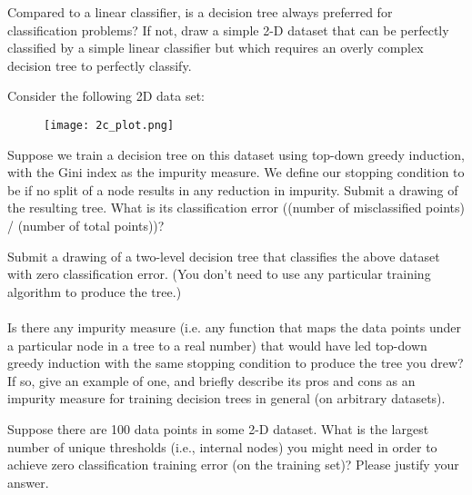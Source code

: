 \newpage
\problem[4] Compared to a linear classifier, is a decision tree always preferred for classification
problems? If not, draw a simple 2-D dataset that can be perfectly classified by a simple linear classifier but which requires an overly complex decision tree to perfectly classify.
\begin{solution}
\end{solution}
\newpage


\problem[15] Consider the following 2D data set:
\noindent
\begin{figure}[H]
\centering
\texttt{[image: 2c\_plot.png]}
\end{figure}
\noindent
\subproblem[5] Suppose we train a decision tree on this dataset using top-down greedy induction, with the Gini index as the impurity measure. We define our stopping condition to be if no split of a node results in any reduction in impurity. Submit a drawing of the resulting tree. What is its classification error ((number of misclassified points) / (number of total points))?
\begin{subsolution}
\end{subsolution}
\newpage


\subproblem[5] Submit a drawing of a two-level decision tree that classifies the above dataset with zero classification error. (You don’t need to use any particular training algorithm to produce the tree.)\\
\\
Is there any impurity measure (i.e. any function that maps the data points under a particular node in a tree to a real number) that would have led top-down greedy induction with the same stopping condition to produce the tree you drew? If so, give an example of one, and briefly describe its pros and cons as an impurity measure for training decision trees in general (on arbitrary datasets).
\begin{subsolution}
\end{subsolution}
\newpage


\subproblem[5] Suppose there are 100 data points in some 2-D dataset. What is the largest number of unique thresholds (i.e., internal nodes) you might need in order to achieve zero classification training error (on the training set)? Please justify your answer.
\begin{subsolution}
\end{subsolution}
\newpage



